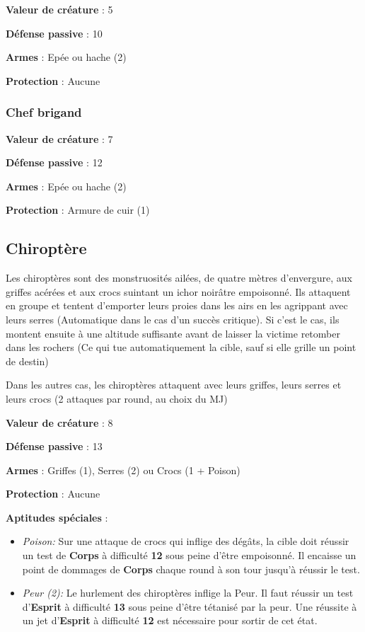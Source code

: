 \documentclass[10pt,twoside,twocolumn,openany,bg=print,justified]{dndbook}
\begin{document}
\textbf{Valeur de créature} : 5

\textbf{Défense passive} : 10

\textbf{Armes} : Epée ou hache (2)

\textbf{Protection} : Aucune

\subsubsection*{Chef brigand}

\textbf{Valeur de créature} : 7

\textbf{Défense passive} : 12

\textbf{Armes} : Epée ou hache (2)

\textbf{Protection} : Armure de cuir (1)

\subsection*{Chiroptère}

Les chiroptères sont des monstruosités ailées, de quatre mètres d'envergure, aux griffes acérées et aux crocs suintant un ichor noirâtre empoisonné. Ils attaquent en groupe et tentent d'emporter leurs proies dans les airs en les agrippant avec leurs serres (Automatique dans le cas d'un succès critique). Si c'est le cas, ils montent ensuite à une altitude suffisante avant de laisser la victime retomber dans les rochers (Ce qui tue automatiquement la cible, sauf si elle grille un point de destin)

Dans les autres cas, les chiroptères attaquent avec leurs griffes, leurs serres et leurs crocs (2 attaques par round, au choix du MJ)

\textbf{Valeur de créature} : 8

\textbf{Défense passive} : 13

\textbf{Armes} : Griffes (1), Serres (2) ou Crocs (1 + Poison)

\textbf{Protection} : Aucune

\textbf{Aptitudes spéciales} : 

\begin{itemize}
	\item \textit{Poison:} Sur une attaque de crocs qui inflige des dégâts, la cible doit réussir un test de \textbf{Corps} à difficulté \textbf{12} sous peine d'être empoisonné. Il encaisse un point de dommages de \textbf{Corps} chaque round à son tour jusqu'à réussir le test.
	\item \textit{Peur (2):} Le hurlement des chiroptères inflige la Peur. Il faut réussir un test d'\textbf{Esprit} à difficulté \textbf{13} sous peine d'être tétanisé par la peur. Une réussite à un jet d'\textbf{Esprit} à difficulté \textbf{12} est nécessaire pour sortir de cet état. 
\end{itemize}
\end{document}
